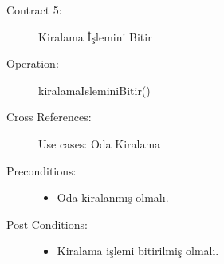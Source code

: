 \documentclass[12pt,a4paper]{report}
\begin{document}
\begin{description}
\item[Contract 5:] Kiralama İşlemini Bitir
\item[Operation:] kiralamaIsleminiBitir()
\item[Cross References:] Use cases: Oda Kiralama
\item[Preconditions:] \hspace{10 mm}
\begin{itemize}
\item Oda kiralanmış olmalı.
\end{itemize}
\item[Post Conditions:] \hspace{10 mm}
\begin{itemize} 
\item Kiralama işlemi bitirilmiş olmalı. \\
\end{itemize}
\end{description}

\newpage
\end{document}
